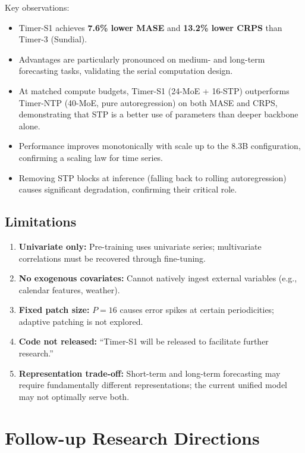\documentclass[11pt]{article}
\begin{document}
\noindent Key observations:
\begin{itemize}
    \item Timer-S1 achieves \textbf{7.6\% lower MASE} and \textbf{13.2\% lower CRPS} than Timer-3 (Sundial).
    \item Advantages are particularly pronounced on medium- and long-term forecasting tasks, validating the serial computation design.
    \item At matched compute budgets, Timer-S1 (24-MoE + 16-STP) outperforms Timer-NTP (40-MoE, pure autoregression) on both MASE and CRPS, demonstrating that STP is a better use of parameters than deeper backbone alone.
    \item Performance improves monotonically with scale up to the 8.3B configuration, confirming a scaling law for time series.
    \item Removing STP blocks at inference (falling back to rolling autoregression) causes significant degradation, confirming their critical role.
\end{itemize}

\subsection{Limitations}

\begin{enumerate}
    \item \textbf{Univariate only:} Pre-training uses univariate series; multivariate correlations must be recovered through fine-tuning.
    \item \textbf{No exogenous covariates:} Cannot natively ingest external variables (e.g., calendar features, weather).
    \item \textbf{Fixed patch size:} $P{=}16$ causes error spikes at certain periodicities; adaptive patching is not explored.
    \item \textbf{Code not released:} ``Timer-S1 will be released to facilitate further research.''
    \item \textbf{Representation trade-off:} Short-term and long-term forecasting may require fundamentally different representations; the current unified model may not optimally serve both.
\end{enumerate}

\section{Follow-up Research Directions}
\end{document}
